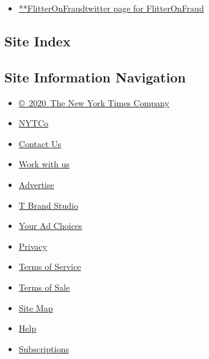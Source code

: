\begin{itemize}
\tightlist
\item
  \href{https://twitter.com/FlitterOnFraud}{**FlitterOnFraudtwitter page
  for FlitterOnFraud}
\end{itemize}

\hypertarget{site-index}{%
\subsection{Site Index}\label{site-index}}

\hypertarget{site-information-navigation}{%
\subsection{Site Information
Navigation}\label{site-information-navigation}}

\begin{itemize}
\tightlist
\item
  \href{https://help.nytimes3xbfgragh.onion/hc/en-us/articles/115014792127-Copyright-notice}{©~2020~The
  New York Times Company}
\end{itemize}

\begin{itemize}
\tightlist
\item
  \href{https://www.nytco.com/}{NYTCo}
\item
  \href{https://help.nytimes3xbfgragh.onion/hc/en-us/articles/115015385887-Contact-Us}{Contact
  Us}
\item
  \href{https://www.nytco.com/careers/}{Work with us}
\item
  \href{https://nytmediakit.com/}{Advertise}
\item
  \href{http://www.tbrandstudio.com/}{T Brand Studio}
\item
  \href{https://www.nytimes3xbfgragh.onion/privacy/cookie-policy\#how-do-i-manage-trackers}{Your
  Ad Choices}
\item
  \href{https://www.nytimes3xbfgragh.onion/privacy}{Privacy}
\item
  \href{https://help.nytimes3xbfgragh.onion/hc/en-us/articles/115014893428-Terms-of-service}{Terms
  of Service}
\item
  \href{https://help.nytimes3xbfgragh.onion/hc/en-us/articles/115014893968-Terms-of-sale}{Terms
  of Sale}
\item
  \href{https://spiderbites.nytimes3xbfgragh.onion}{Site Map}
\item
  \href{https://help.nytimes3xbfgragh.onion/hc/en-us}{Help}
\item
  \href{https://www.nytimes3xbfgragh.onion/subscription?campaignId=37WXW}{Subscriptions}
\end{itemize}
